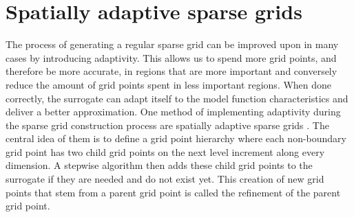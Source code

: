 \documentclass[
  a4paper,  %
  twoside,  %
  bibliography=totoc,
  headsepline,
  cleardoublepage=empty,
  parskip=half,
  draft=false
]{scrbook}
\begin{document}
\section{Spatially adaptive sparse grids}

The process of generating a regular sparse grid can be improved upon in many cases by introducing adaptivity.
This allows us to spend more grid points, and therefore be more accurate, in regions that are more important and conversely reduce the amount of grid points spent in less important regions.
When done correctly, the surrogate can adapt itself to the model function characteristics and deliver a better approximation.
One method of implementing adaptivity during the sparse grid construction process are spatially adaptive sparse grids \cite{Pflueger2012}.
The central idea of them is to define a grid point hierarchy where each non-boundary grid point has two child grid points on the next level increment along every dimension.
A stepwise algorithm then adds these child grid points to the surrogate if they are needed and do not exist yet.
This creation of new grid points that stem from a parent grid point is called the refinement of the parent grid point.
\end{document}
